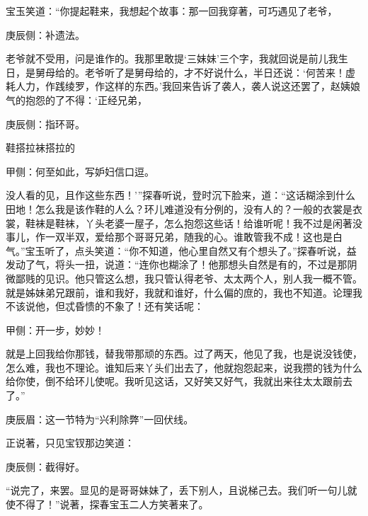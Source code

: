 \begin{parag}
    宝玉笑道：“你提起鞋来，我想起个故事：那一回我穿著，可巧遇见了老爷，\begin{note}庚辰侧：补遗法。\end{note}老爷就不受用，问是谁作的。我那里敢提‘三妹妹’三个字，我就回说是前儿我生日，是舅母给的。老爷听了是舅母给的，才不好说什么，半日还说：‘何苦来！虚耗人力，作践绫罗，作这样的东西。’我回来告诉了袭人，袭人说这还罢了，赵姨娘气的抱怨的了不得：‘正经兄弟，\begin{note}庚辰侧：指环哥。\end{note}鞋搭拉袜搭拉的\begin{note}甲侧：何至如此，写妒妇信口逗。\end{note}没人看的见，且作这些东西！’”探春听说，登时沉下脸来，道：“这话糊涂到什么田地！怎么我是该作鞋的人么？环儿难道没有分例的，没有人的？一般的衣裳是衣裳，鞋袜是鞋袜，丫头老婆一屋子，怎么抱怨这些话！给谁听呢！我不过是闲著没事儿，作一双半双，爱给那个哥哥兄弟，随我的心。谁敢管我不成！这也是白气。”宝玉听了，点头笑道：“你不知道，他心里自然又有个想头了。”探春听说，益发动了气，将头一扭，说道：“连你也糊涂了！他那想头自然是有的，不过是那阴微鄙贱的见识。他只管这么想，我只管认得老爷、太太两个人，别人我一概不管。就是姊妹弟兄跟前，谁和我好，我就和谁好，什么偏的庶的，我也不知道。论理我不该说他，但忒昏愦的不象了！还有笑话呢：\begin{note}甲侧：开一步，妙妙！\end{note}就是上回我给你那钱，替我带那顽的东西。过了两天，他见了我，也是说没钱使，怎么难，我也不理论。谁知后来丫头们出去了，他就抱怨起来，说我攒的钱为什么给你使，倒不给环儿使呢。我听见这话，又好笑又好气，我就出来往太太跟前去了。”\begin{note}庚辰眉：这一节特为“兴利除弊”一回伏线。\end{note}正说著，只见宝钗那边笑道：\begin{note}庚辰侧：截得好。\end{note}“说完了，来罢。显见的是哥哥妹妹了，丢下别人，且说梯己去。我们听一句儿就使不得了！”说著，探春宝玉二人方笑著来了。
\end{parag}


